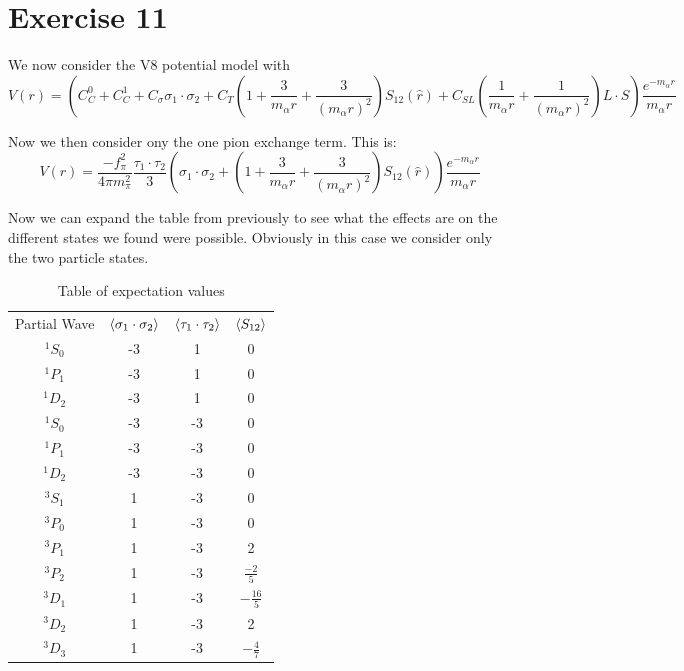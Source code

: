 \documentclass[11pt]{article} %
\begin{document}
\section{Exercise 11}

We now consider the V8 potential model with\\

\begin{equation}
V(r)=\left(C_C^0+C_C^1+C_\sigma \sigma_1 \cdot \sigma_2 + C_T \left( 1+\frac{3}{m_\alpha r} +\frac{3}{(m_\alpha r)^2}\right) S_{12}(\hat{r})+C_{SL}\left(\frac{1}{m_\alpha r}+\frac{1}{(m_\alpha r)^2}\right) L\cdot S\right) \frac{e^{-m_\alpha r}}{m_\alpha r}
\end{equation}


Now we then consider ony the one pion exchange term. This is:\\

\begin{equation}
V(r)=\frac{-f_\pi^2}{4\pi m_\pi^2 }\frac{\tau_1 \cdot \tau_2}{3}\left( \sigma_1 \cdot \sigma_2 +  \left( 1+\frac{3}{m_\alpha r} +\frac{3}{(m_\alpha r)^2}\right) S_{12}(\hat{r})\right)  \frac{e^{-m_\alpha r}}{m_\alpha r}
\end{equation}

Now we can expand the table from previously to see what the effects are on the different states we found were possible. Obviously in this case we consider only the two particle states.\\

\begin{table}[hbt!]
\centering
\caption{Table of expectation values}
\begin{tabular}{c|c|c|c}
Partial Wave & $\braket{\sigma_1 \cdot \sigma_2}$ & $\braket{\tau_1 \cdot \tau_2}$ & $ \braket{S_{12}}$ \\
$^1 S_0$ & -3 & 1 & 0 \\
$^1 P_1 $& -3 & 1 & 0\\
$^1 D_2$ & -3 & 1 & 0\\
$^1 S_0$ & -3 & -3 & 0\\
$^1 P_1 $& -3 & -3 & 0\\
$^1 D_2 $& -3 & -3 & 0\\
$^3 S_1 $& 1 & -3 & 0\\
$^3 P_0 $& 1 & -3 & 0\\
$^3 P_1 $& 1 & -3 & 2\\
$^3 P_2 $& 1 & -3 &$\frac{-2}{5} $\\
$^3 D_1 $& 1 & -3 &$ -\frac{16}{5}$\\
$^3 D_2 $& 1 & -3 & 2\\
$^3 D_3 $& 1 & -3 & $-\frac{4}{7}$\\

\end{tabular}

\end{table}
\end{document}
